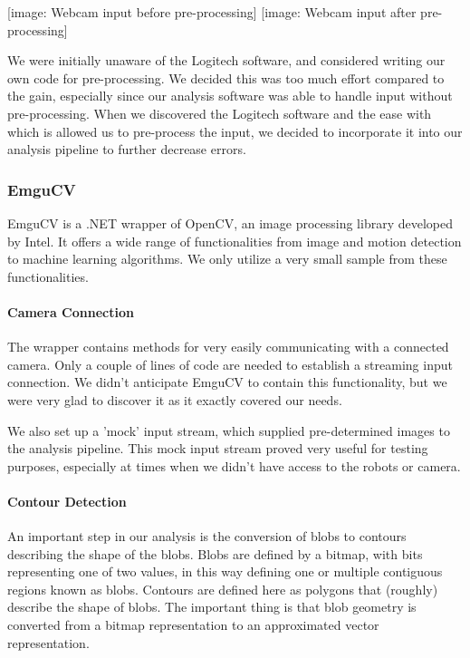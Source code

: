 \documentclass[10pt,twocolumn]{article}
\begin{document}
[image: Webcam input before pre-processing] [image: Webcam input after pre-processing]

We were initially unaware of the Logitech software, and considered writing our own code for pre-processing. We decided this was too much effort compared to the gain, especially since our analysis software was able to handle input without pre-processing. When we discovered the Logitech software and the ease with which is allowed us to pre-process the input, we decided to incorporate it into our analysis pipeline to further decrease errors.

\subsubsection{EmguCV}
EmguCV is a .NET wrapper of OpenCV, an image processing library developed by Intel. It offers a wide range of functionalities from image and motion detection to machine learning algorithms. We only utilize a very small sample from these functionalities.

\paragraph{Camera Connection}
The wrapper contains methods for very easily communicating with a connected camera. Only a couple of lines of code are needed to establish a streaming input connection. We didn't anticipate EmguCV to contain this functionality, but we were very glad to discover it as it exactly covered our needs.

We also set up a 'mock' input stream, which supplied pre-determined images to the analysis pipeline. This mock input stream proved very useful for testing purposes, especially at times when we didn't have access to the robots or camera.

\paragraph{Contour Detection}
An important step in our analysis is the conversion of blobs to contours describing the shape of the blobs. Blobs are defined by a bitmap, with bits representing one of two values, in this way defining one or multiple contiguous regions known as blobs. Contours are defined here as polygons that (roughly) describe the shape of blobs. The important thing is that blob geometry is converted from a bitmap representation to an approximated vector representation.
\end{document}
